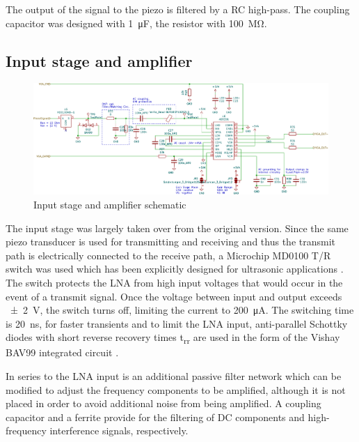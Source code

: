 \documentclass[
	english,
	ruledheaders=section, %
	class=report,%
	thesis={type=Project Seminar Report},%
	accentcolor=TUDa-1d, %
	custommargins=false,%
	marginpar=false,%
	parskip=half-,%
	fontsize=11pt,%
]{tudapub}
\begin{document}
The output of the signal to the piezo is filtered by a RC high-pass. The coupling capacitor was designed with \SI{1}{\micro\farad}, the resistor with \SI{100}{\mega\ohm}.

\subsection{Input stage and amplifier}

\begin{figure}[H]
    \centering
    \includegraphics[width=1.0\columnwidth]{schematics/sch_inputstage.pdf}
    \caption{Input stage and amplifier schematic}
    \label{sch:inputstage}
\end{figure}
The input stage was largely taken over from the original version. Since the same piezo transducer is used for transmitting and receiving and thus the transmit path is electrically connected to the receive path, a Microchip MD0100 T/R switch was used which has been explicitly designed for ultrasonic applications \autocite{microchiptechnologyinc.SingleDualChannelHighVoltage2018}. The switch protects the \gls{LNA} from high input voltages that would occur in the event of a transmit signal. Once the voltage between input and output exceeds \SI{\pm2}{\volt}, the switch turns off, limiting the current to \SI{200}{\micro\ampere}. The switching time is \SI{20}{\nano\second}, for faster transients and to limit the \gls{LNA} input, anti-parallel Schottky diodes with short reverse recovery times t\textsubscript{rr} are used in the form of the Vishay BAV99 integrated circuit \autocite{vishaysemiconductorSmallSignalSwitching2018}.

In series to the \gls{LNA} input is an additional passive filter network which can be modified to adjust the frequency components to be amplified, although it is not placed in order to avoid additional noise from being amplified. A coupling capacitor and a ferrite provide for the filtering of DC components and high-frequency interference signals, respectively.
\end{document}
